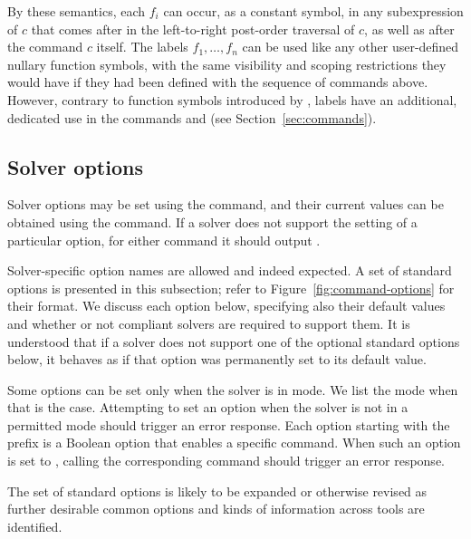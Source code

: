 By these semantics, each  $f_i$ can occur, as a constant symbol, 
in any subexpression of $c$ that comes after  
in the left-to-right post-order traversal of $c$, as well as after the command $c$ itself.
The labels $f_1, \ldots, f_n$ can be used like any other user-defined nullary
function symbols, with the same visibility and scoping restrictions 
they would have if they had been defined with the sequence of commands above. 
However, contrary to function symbols introduced by ,
labels have an additional, dedicated use in the commands 
 and 
(see Section~\ref{sec:commands}).


\subsection{Solver options} \label{sec:options}

Solver options may be set using the  command, and
their current values can be obtained using the  command.  
If a solver does not support the setting of a particular option,
for either command it should output .  

Solver-specific option names are allowed and indeed expected.  
A set of standard options is presented in this subsection;
refer to Figure~\ref{fig:command-options} for their format. 
We discuss each option below, specifying also their default values and 
whether or not compliant solvers are required to support them. 
It is understood that if a solver does not support one of the optional 
standard options below, it behaves as if that option was permanently
set to its default value. 

Some options can be set only when the solver is in  mode.
We list the mode when that is the case.
Attempting to set an option when the solver is not in a permitted mode 
should trigger an error response.
Each option starting with the  prefix is a Boolean option
that enables a specific command.
When such an option is set to , calling the corresponding
command should trigger an error response.

The set of standard options is likely to be expanded or otherwise revised 
as further desirable common options and kinds of information across tools
are identified.  

